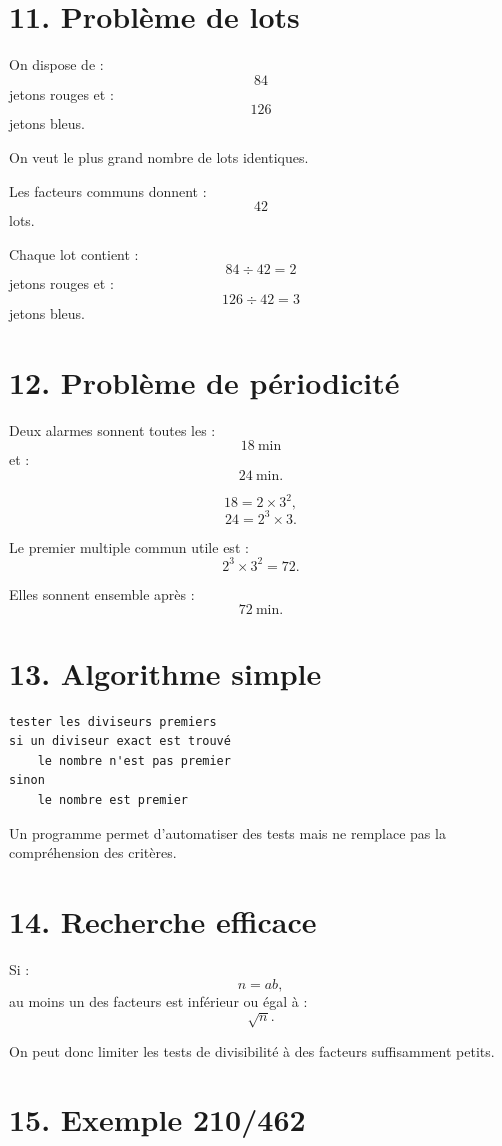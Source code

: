 \section{11. Problème de lots}

On dispose de :
\[
84
\]
jetons rouges et :
\[
126
\]
jetons bleus.

On veut le plus grand nombre de lots identiques.

Les facteurs communs donnent :
\[
42
\]
lots.

Chaque lot contient :
\[
84\div42=2
\]
jetons rouges et :
\[
126\div42=3
\]
jetons bleus.

\section{12. Problème de périodicité}

Deux alarmes sonnent toutes les :
\[
18\ \text{min}
\]
et :
\[
24\ \text{min}.
\]

\[
18=2\times3^2,
\]
\[
24=2^3\times3.
\]

Le premier multiple commun utile est :
\[
2^3\times3^2=72.
\]

Elles sonnent ensemble après :
\[
\boxed{72\ \text{min}}.
\]

\section{13. Algorithme simple}

\begin{verbatim}
tester les diviseurs premiers
si un diviseur exact est trouvé
    le nombre n'est pas premier
sinon
    le nombre est premier
\end{verbatim}

Un programme permet d'automatiser des tests mais ne remplace pas la compréhension des critères.

\section{14. Recherche efficace}

Si :
\[
n=ab,
\]
au moins un des facteurs est inférieur ou égal à :
\[
\sqrt n.
\]

On peut donc limiter les tests de divisibilité à des facteurs suffisamment petits.

\section{15. Exemple 210/462}

